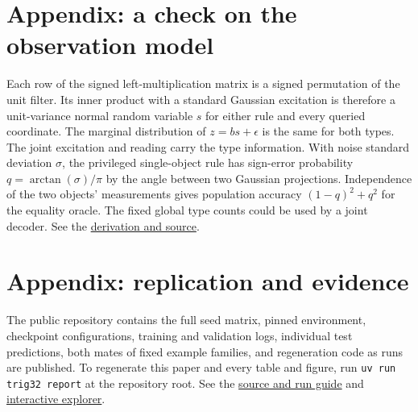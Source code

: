 \documentclass[10pt]{article}
\begin{document}
\section*{Appendix: a check on the observation model}
Each row of the signed left-multiplication matrix is a signed permutation of the unit filter. Its inner product with a standard Gaussian excitation is therefore a unit-variance normal random variable $s$ for either rule and every queried coordinate. The marginal distribution of $z=bs+\epsilon$ is the same for both types. The joint excitation and reading carry the type information. With noise standard deviation $\sigma$, the privileged single-object rule has sign-error probability $q=\arctan(\sigma)/\pi$ by the angle between two Gaussian projections. Independence of the two objects' measurements gives population accuracy $(1-q)^2+q^2$ for the equality oracle. The fixed global type counts could be used by a joint decoder. See the \href{https://github.com/BurnyCoder/trigintaduonion-neural-network/blob/main/reports/reviews/sensor-and-oracle.md}{derivation and source}.

\section*{Appendix: replication and evidence}
The public repository contains the full seed matrix, pinned environment, checkpoint configurations, training and validation logs, individual test predictions, both mates of fixed example families, and regeneration code as runs are published. To regenerate this paper and every table and figure, run \texttt{uv run trig32 report} at the repository root. See the \href{https://github.com/BurnyCoder/trigintaduonion-neural-network}{source and run guide} and \href{https://burnycoder.github.io/trigintaduonion-neural-network/}{interactive explorer}.
\end{document}
